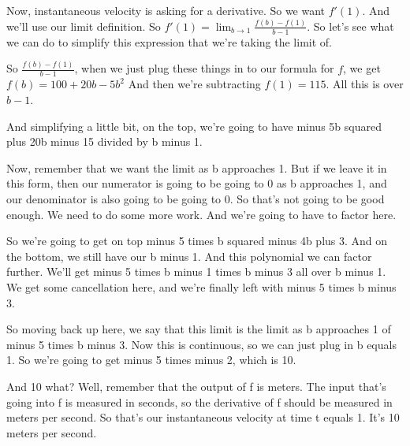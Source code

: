 \documentclass[pdftex, brazil, 12pt, twoside]{article}
\begin{document}
Now, instantaneous velocity is asking for a derivative.
So we want $f'(1)$.
And we'll use our limit definition.
So $\displaystyle f'(1) = \lim_{b \to 1} \frac{f(b) - f(1)}{b-1}$.
So let's see what we can do to simplify this expression
that we're taking the limit of.

So $\frac{f(b)-f(1)}{b -1}$,
when we just plug these things in to our formula for $f$,
we get $\displaystyle f(b) = 100 + 20b - 5b^2$
And then we're subtracting $f(1) = 115$.
All this is over $b - 1$.

And simplifying a little bit, on the top,
we're going to have minus 5b squared plus 20b minus 15
divided by b minus 1.

Now, remember that we want the limit as b approaches 1.
But if we leave it in this form, then our numerator
is going to be going to 0 as b approaches 1,
and our denominator is also going to be going to 0.
So that's not going to be good enough.
We need to do some more work.
And we're going to have to factor here.

So we're going to get on top minus 5 times
b squared minus 4b plus 3.
And on the bottom, we still have our b minus 1.
And this polynomial we can factor further.
We'll get minus 5 times b minus 1 times b
minus 3 all over b minus 1.
We get some cancellation here, and we're finally left
with minus 5 times b minus 3.

So moving back up here, we say that this limit
is the limit as b approaches 1 of minus 5 times b minus 3.
Now this is continuous, so we can just plug in b equals 1.
So we're going to get minus 5 times minus 2, which is 10.

And 10 what?
Well, remember that the output of f is meters.
The input that's going into f is measured in seconds,
so the derivative of f should be measured in meters per second.
So that's our instantaneous velocity at time t equals 1.
It's 10 meters per second.

\begin{figure}[H]
  \begin{center}
    \label{fig:derivative-at-point-2}
  \end{center}
\end{figure}
\end{document}
